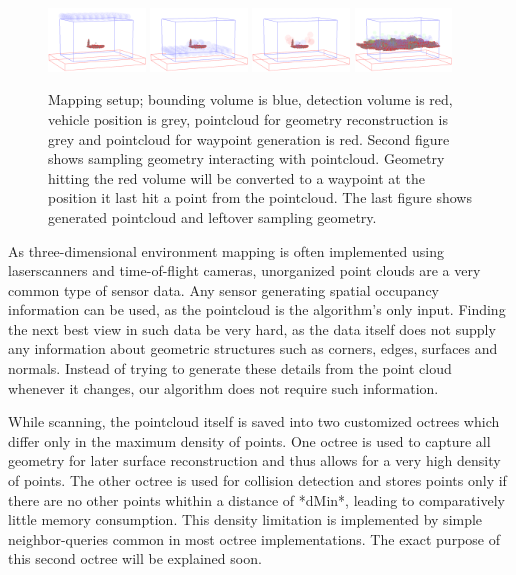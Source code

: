 \documentclass[a4paper, 10pt, conference]{ieeeconf}        %
\begin{document}
\begin{figure}[ht]
  \centering
    \includegraphics[width=0.23\textwidth]{images/expl1}
    \includegraphics[width=0.23\textwidth]{images/expl2}
    \includegraphics[width=0.23\textwidth]{images/expl3}
    \includegraphics[width=0.23\textwidth]{images/process5}
    \caption{Mapping setup; bounding volume is blue, detection volume is red, vehicle position is grey, pointcloud for geometry reconstruction is grey and pointcloud for waypoint generation is red. Second figure shows sampling geometry interacting with pointcloud. Geometry hitting the red volume will be converted to a waypoint at the position it last hit a point from the pointcloud. The last figure shows generated pointcloud and leftover sampling geometry.}
\end{figure}

As three-dimensional environment mapping is often implemented using laserscanners and time-of-flight cameras, unorganized point clouds are a very common type of sensor data. Any sensor generating spatial occupancy information can be used, as the pointcloud is the algorithm's only input. Finding the next best view in such data be very hard, as the data itself does not supply any information about geometric structures such as corners, edges, surfaces and normals. Instead of trying to generate these details from the point cloud whenever it changes, our algorithm does not require such information.

While scanning, the pointcloud itself is saved into two customized octrees which differ only in the maximum density of points. One octree is used to capture all geometry for later surface reconstruction and thus allows for a very high density of points. The other octree is used for collision detection and stores points only if there are no other points whithin a distance of *dMin*, leading to comparatively little memory consumption. This density limitation is implemented by simple neighbor-queries common in most octree implementations. The exact purpose of this second octree will be explained soon.
\end{document}
